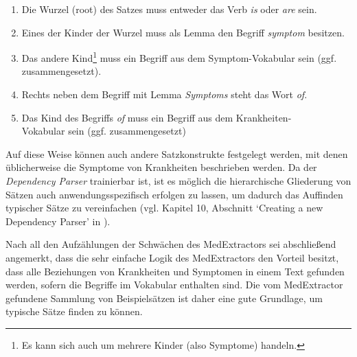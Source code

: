 \begin{enumerate}
	\item Die Wurzel (root) des Satzes muss entweder das Verb \emph{is} oder \emph{are} sein.
	\item Eines der Kinder der Wurzel muss als Lemma den Begriff \emph{symptom} besitzen.
	\item Das andere Kind\footnote{Es kann sich auch um mehrere Kinder (also Symptome) handeln.} muss ein Begriff aus dem Symptom-Vokabular sein (ggf. zusammengesetzt).
	\item Rechts neben dem Begriff mit Lemma \emph{Symptoms} steht das Wort \emph{of}.
	\item Das Kind des Begriffs \emph{of} muss ein Begriff aus dem Krankheiten-\\Vokabular sein (ggf. zusammengesetzt)
\end{enumerate}

Auf diese Weise können auch andere Satzkonstrukte festgelegt werden, mit denen üblicherweise die Symptome von Krankheiten beschrieben werden. Da der \emph{Dependency Parser} trainierbar ist, ist es möglich die hierarchische Gliederung von Sätzen auch anwendungsspezifisch erfolgen zu lassen, um dadurch das Auffinden typischer Sätze zu vereinfachen (vgl. Kapitel 10, Abschnitt `Creating a new Dependency Parser' in \cite{vasiliev2020natural}).

Nach all den Aufzählungen der Schwächen des MedExtractors sei abschließend angemerkt, dass die sehr einfache Logik des MedExtractors den Vorteil besitzt, dass alle Beziehungen von Krankheiten und Symptomen in einem Text gefunden werden, sofern die Begriffe im Vokabular enthalten sind. Die vom MedExtractor gefundene Sammlung von Beispielsätzen ist daher eine gute Grundlage, um typische Sätze finden zu können.
